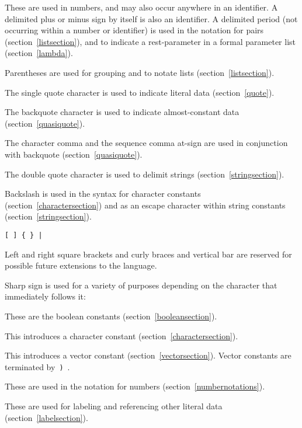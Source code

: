 \begin{description}{}{}

\item[{\tt.\ + -}]
These are used in numbers, and may also occur anywhere in an identifier.
A delimited plus or minus sign by itself
is also an identifier.
A delimited period (not occurring within a number or identifier) is used
in the notation for pairs (section~\ref{listsection}), and to indicate a
rest-parameter in a  formal parameter list (section~\ref{lambda}).

\item[\tt( )]
Parentheses are used for grouping and to notate lists
(section~\ref{listsection}).

\item[\singlequote]
The single quote character is used to indicate literal data (section~\ref{quote}).

\item[\backquote]
The backquote character is used to indicate almost-constant
data (section~\ref{quasiquote}).

\item[\tt, ,@]
The character comma and the sequence comma at-sign are used in conjunction
with backquote (section~\ref{quasiquote}).

\item[\tt"]
The double quote character is used to delimit strings (section~\ref{stringsection}).

\item[\backwhack]
Backslash is used in the syntax for character constants
(section~\ref{charactersection}) and as an escape character within string
constants (section~\ref{stringsection}).

\hbox{\tt \verb"[" \verb"]" \verb"{" \verb"}" \verb"|"}
\item[\copy0]
Left and right square brackets and curly braces and vertical bar
are reserved for possible future extensions to the language.

\item[\sharpsign] Sharp sign is used for a variety of purposes depending on
the character that immediately follows it:

\item[\schtrue{} \schfalse{}]
These are the boolean constants (section~\ref{booleansection}).

\item[\sharpsign\backwhack]
This introduces a character constant (section~\ref{charactersection}).

\item[\sharpsign\tt(]
This introduces a vector constant (section~\ref{vectorsection}).  Vector constants
are terminated by~{\tt)}~.

\item[{\tt\#e \#i \#b \#o \#d \#x}]
These are used in the notation for numbers (section~\ref{numbernotations}).

\item[\hyper{digit}]
These are used for labeling and referencing other literal data (section~\ref{labelsection}).

\end{description}
